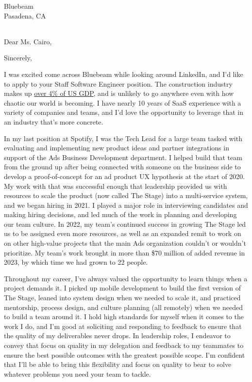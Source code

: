 

{Bluebeam
	\\Pasadena, CA}

\date{August 30, 2024}
\opening{\\Dear Ms. Cairo,}
\closing{Sincerely,}
\makelettertitle


I was excited come across Bluebeam while looking around LinkedIn, and I'd like to apply to your Staff Software Engineer position.
The construction industry makes up \textcolor{color1}{\href{https://fred.stlouisfed.org/series/VAPGDPC}{over 4\% of US GDP}},
and is unlikely to go anywhere even with how chaotic our world is becoming.
I have nearly 10 years of SaaS experience with a variety of companies and teams, 
and I'd love the opportunity to leverage that in an industry that's more concrete.

In my last position at Spotify, I was the Tech Lead for a large team tasked with evaluating and implementing new product ideas
and partner integrations in support of the Ads Business Development department.
I helped build that team from the ground up after being connected with someone on the business side to develop a proof-of-concept
for an ad product UX hypothesis at the start of 2020. My work with that was successful enough that leadership provided us with resources
to scale the product (now called The Stage) into a multi-service system, and we began hiring in 2021.
I played a major role in interviewing candidates and making hiring decisions,
and led much of the work in planning and developing our team culture.
In 2022, my team's continued success in growing The Stage led us to be assigned even more resources,
as well as an expanded remit to work on on other high-value projects that the main Ads organization couldn't or wouldn't prioritize.
My team's work brought in more than \$70 million of added revenue in 2023, by which time we had grown to 22 people.

Throughout my career, I've always valued the opportunity to learn things when a project demands it.
I picked up mobile development to build the first version of The Stage, leaned into system design when we needed to scale it,
and practiced mentorship, process design, and culture planning (all remotely) when we needed to build a team around it.
I  hold high standards for myself when it comes to the work I do, and I'm good at soliciting and responding to
feedback to ensure that the quality of my deliverables never drops. In leadership roles, I endeavor to
convey that focus on quality in my delegation and feedback to my teammates to ensure the best possible outcomes
with the greatest possible scope.
I'm confident that I'll be able to bring this flexibility and focus on quality to bear to solve whatever problems
you need your team to tackle.

